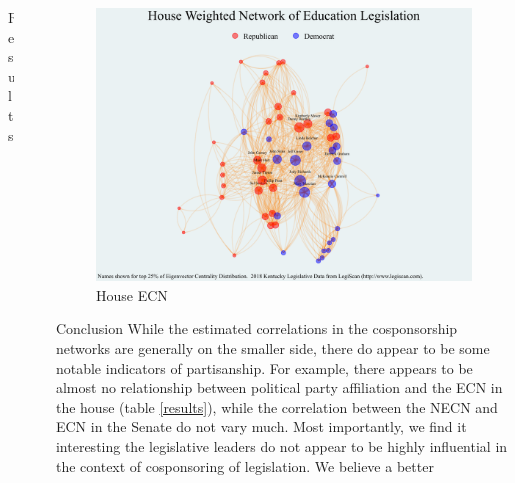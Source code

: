 \documentclass[final]{beamer}
\newlength{\sepwid}
\newlength{\onecolwid}
\newlength{\twocolwid}
\begin{document}
\begin{frame}[t]
\begin{columns}[t]
\begin{column}{\twocolwid}
\begin{alertblock}{Results}
				\end{alertblock} 

			\end{column} %

			\begin{column}{\sepwid}\end{column} %
			
			\begin{column}{\onecolwid} %
				\begin{figure}
					\includegraphics[scale=0.95]{houseedwgt-graph.pdf}
					\caption{House ECN \label{houseed}}
				\end{figure}
				\begin{block}{Conclusion}
					While the estimated correlations in the cosponsorship networks are generally on the smaller side, there do appear 
					to be some notable indicators of partisanship.  For example, there appears to be almost no relationship between 
					political party affiliation and the ECN in the house (table \ref{results}), while the correlation between the 
					NECN and ECN in the Senate do not vary much.  Most importantly, we find it interesting the legislative leaders 
					do not appear to be highly influential in the context of cosponsoring of legislation.  We believe a better 

\end{block}
\end{column}
\end{columns}
\end{frame}
\end{document}
